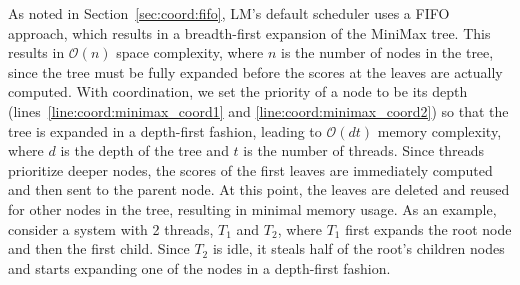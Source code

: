 As noted in Section~\ref{sec:coord:fifo}, LM's default scheduler uses a FIFO
approach, which results in a breadth-first expansion of the MiniMax tree. This
results in $\mathcal{O}(n)$ space complexity, where $n$ is the number of nodes
in the tree, since the tree must be fully expanded before the scores at the
leaves are actually computed.  With coordination, we set the priority of a node
to be its depth (lines~\ref{line:coord:minimax_coord1} and
\ref{line:coord:minimax_coord2}) so that the tree is expanded in a depth-first
fashion, leading to $\mathcal{O}(d t)$ memory complexity, where $d$ is the depth
of the tree and $t$ is the number of threads. Since threads prioritize deeper
nodes, the scores of the first leaves are immediately computed and then sent to
the parent node. At this point, the leaves are deleted and reused for other
nodes in the tree, resulting in minimal memory usage.  As an example, consider a
system with 2 threads, $T_1$ and $T_2$, where $T_1$ first expands the root node
and then the first child. Since $T_2$ is idle, it steals half of the root's
children nodes and starts expanding one of the nodes in a depth-first fashion.

